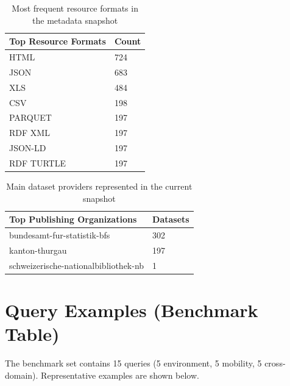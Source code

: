 \documentclass[11pt,a4paper]{article}
\begin{document}
\begin{table}[H]
\centering
\begin{tabular}{p{} p{}}
\toprule
\textbf{Top Resource Formats} & \textbf{Count} \\
\midrule
HTML & 724 \\
JSON & 683 \\
XLS & 484 \\
CSV & 198 \\
PARQUET & 197 \\
RDF XML & 197 \\
JSON-LD & 197 \\
RDF TURTLE & 197 \\
\bottomrule
\end{tabular}
\caption{Most frequent resource formats in the metadata snapshot}
\end{table}

\begin{table}[H]
\centering
\begin{tabular}{p{} p{}}
\toprule
\textbf{Top Publishing Organizations} & \textbf{Datasets} \\
\midrule
bundesamt-fur-statistik-bfs & 302 \\
kanton-thurgau & 197 \\
schweizerische-nationalbibliothek-nb & 1 \\
\bottomrule
\end{tabular}
\caption{Main dataset providers represented in the current snapshot}
\end{table}

\section{Query Examples (Benchmark Table)}

The benchmark set contains 15 queries (5 environment, 5 mobility, 5 cross-domain). Representative examples are shown below.
\end{document}

